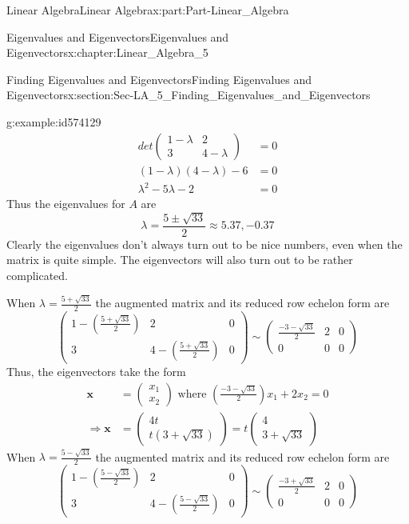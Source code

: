 \documentclass[oneside,10pt,]{book}
\numberwithin{equation}{section}
\newcommand{\amp}{&}
\begin{document}
\begin{partptx}{Linear Algebra}{}{Linear Algebra}{}{}{x:part:Part-Linear_Algebra}
\begin{chapterptx}{Eigenvalues and Eigenvectors}{}{Eigenvalues and Eigenvectors}{}{}{x:chapter:Linear_Algebra_5}
\begin{sectionptx}{Finding Eigenvalues and Eigenvectors}{}{Finding Eigenvalues and Eigenvectors}{}{}{x:section:Sec-LA_5_Finding_Eigenvalues_and_Eigenvectors}
\begin{example}{}{g:example:id574129}
\begin{align*}
det\begin{pmatrix} 1-\lambda \amp 2 \\ 3\amp 4-\lambda \end{pmatrix} \amp =0\\
(1-\lambda)(4-\lambda)-6 \amp =0\\
\lambda^2-5\lambda-2 \amp =0
\end{align*}
Thus the eigenvalues for \(A\) are%
\begin{equation*}
\lambda=\frac{5\pm\sqrt{33}}{2}\approx 5.37, -0.37
\end{equation*}
Clearly the eigenvalues don’t always turn out to be nice numbers, even when the matrix is quite simple. The eigenvectors will also turn out to be rather complicated.%
\par
When \(\lambda=\frac{5+\sqrt{33}}{2}\) the augmented matrix and its reduced row echelon form are%
\begin{equation*}
\begin{pmatrix} 1-\left(\frac{5+\sqrt{33}}{2} \right) \amp 2 \amp 0 \\ 3 \amp 4-\left(\frac{5+\sqrt{33}}{2} \right) \amp 0 \end{pmatrix} \sim \begin{pmatrix} \frac{-3-\sqrt{33}}{2} \amp 2 \amp 0 \\ 0 \amp 0 \amp 0 \end{pmatrix} 
\end{equation*}
Thus, the eigenvectors take the form%
\begin{align*}
\mathbf{x} \amp =\begin{pmatrix} x_1 \\ x_2 \end{pmatrix} \textrm{ where } \left(\frac{-3-\sqrt{33}}{2}\right)x_1+2x_2=0 \\
\Rightarrow \mathbf{x} \amp =\begin{pmatrix} 4t \\ t(3+\sqrt{33}) \end{pmatrix} = t\begin{pmatrix} 4 \\ 3+\sqrt{33} \end{pmatrix}
\end{align*}
When \(\lambda=\frac{5-\sqrt{33}}{2}\) the augmented matrix and its reduced row echelon form are%
\begin{equation*}
\begin{pmatrix} 1-\left(\frac{5-\sqrt{33}}{2} \right) \amp 2 \amp 0 \\ 3 \amp 4-\left(\frac{5-\sqrt{33}}{2} \right) \amp 0 \end{pmatrix} \sim \begin{pmatrix} \frac{-3+\sqrt{33}}{2} \amp 2 \amp 0 \\ 0 \amp 0 \amp 0 \end{pmatrix} 

\end{equation*}
\end{example}
\end{sectionptx}
\end{chapterptx}
\end{partptx}
\end{document}
